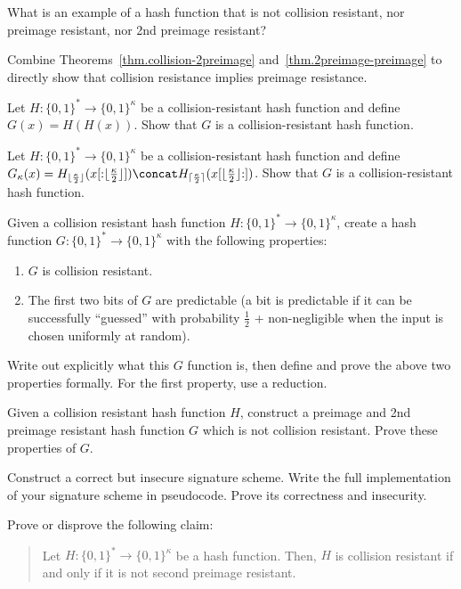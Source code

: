 \begin{problems}
  \item What is an example of a hash function that is not collision resistant, nor preimage resistant, nor
        2nd preimage resistant?
  \item Combine Theorems~\ref{thm.collision-2preimage} and~\ref{thm.2preimage-preimage} to
        directly show that collision resistance implies preimage resistance.
  \item Let $H:\{0,1\}^* \to \{0,1\}^{\kappa}$ be a collision-resistant hash
        function and define $G(x) = H(H(x))$. Show that $G$ is a
        collision-resistant hash function.
  \item Let $H:\{0,1\}^* \to \{0,1\}^{\kappa}$ be a collision-resistant hash
        function and define $G_\kappa(x) = H_{\lfloor\frac{\kappa}{2}\rfloor}(x[{:}{\lfloor\frac{\kappa}{2}\rfloor}]) \concat H_{\lceil\frac{\kappa}{2}\rceil}(x[{\lfloor\frac{\kappa}{2}\rfloor}{:}])$. Show that $G$ is a
        collision-resistant hash function.
  \item Given a collision resistant hash function
        $H: \{0, 1\}^* \longrightarrow \{0, 1\}^\kappa$, create a hash function
        $G: \{0, 1\}^* \longrightarrow \{0, 1\}^\kappa$ with the following
        properties:
        \begin{enumerate}
          \item $G$ is collision resistant.
          \item The first two bits of $G$ are predictable (a bit is predictable
                if it can be successfully ``guessed'' with probability
                $\frac{1}{2}$ + non-negligible when the input is chosen
                uniformly at random).
        \end{enumerate}
        Write out explicitly what this $G$ function is, then define and prove
        the above two properties formally. For the first property, use a
        reduction.
  \item Given a collision resistant hash function $H$, construct a preimage and
        2nd preimage resistant hash function $G$ which is not collision
        resistant. Prove these properties of $G$.
  \item Construct a correct but insecure signature scheme. Write the full
        implementation of your signature scheme in pseudocode. Prove its
        correctness and insecurity.
  \item Prove or disprove the following claim:
        \begin{quote}
          Let $H: \{0, 1\}^* \longrightarrow \{0, 1\}^\kappa$ be a hash
          function. Then, $H$ is collision resistant if and only if it is not
          second preimage resistant.
        \end{quote}
\end{problems}

